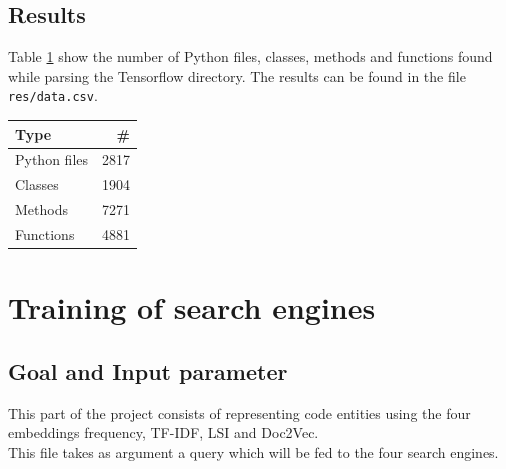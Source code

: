 \documentclass [14 pt]{article}
\begin{document}
\subsection{Results}
Table \ref{tab:DataExtraction} show the number of Python files, classes, methods and functions found while parsing the Tensorflow directory. The results can be found in the file \texttt{res/data.csv}.

\begin{table}[h]
\centering
\begin{tabular}{| l r |}
\hline
\textbf{Type}	&  \textbf{\#}	\\ \hline\hline
Python files 	&	2817	\\
Classes			&	1904	\\
Methods			&	7271	\\
Functions		&	4881	\\ \hline
\end{tabular}
\label{tab:DataExtraction}
\end{table}

\section{Training of search engines} %
\subsection{Goal and Input parameter} %
This part of the project consists of representing code entities using the four embeddings frequency, TF-IDF, LSI and Doc2Vec.\\
This file takes as argument a query which will be fed to the four search engines. 
\end{document}
